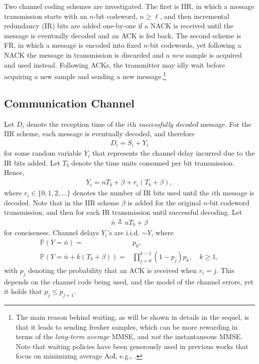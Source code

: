 \documentclass[12pt,journal,onecolumn]{IEEEtran}
\begin{document}
Two channel coding schemes are investigated. The first is IIR, in which a message transmission starts with an $n$-bit codeword, $n\geq\ell$, and then incremental redundancy (IR) bits are added one-by-one if a NACK is received until the message is eventually decoded and an ACK is fed back. The second scheme is FR, in which a message is encoded into fixed $n$-bit codewords, yet following a NACK the message in transmission is discarded and a {\it new} sample is acquired and used instead. Following ACKs, the transmitter may idly wait before acquiring a new sample and sending a new message.\footnote{The main reason behind waiting, as will be shown in details in the sequel, is that it leads to sending fresher samples, which can be more rewarding in terms of the {\it long-term average} MMSE, and {\it not} the instantaneous MMSE. Note that waiting policies have been generously used in previous works that focus on minimizing average AoI, e.g., \cite{yates_age_eh, sun-age-mdp, arafa-age-online-finite}.}


\subsection{Communication Channel}

Let $D_i$ denote the reception time of the $i$th {\it successfully decoded} message. For the IIR scheme, each message is eventually decoded, and therefore
\begin{align}
D_i=S_i+Y_i
\end{align}
for some random variable $Y_i$ that represents the channel delay incurred due to the IR bits added. Let $T_b$ denote the time units consumed per bit transmission. Hence,
\begin{align}
Y_i=nT_b+\beta+r_i(T_b+\beta),
\end{align}
where $r_i\in\{0,1,2,\dots\}$ denotes the number of IR bits used until the $i$th message is decoded. Note that in the IIR scheme $\beta$ is added for the original $n$-bit codeword transmission, and then for each IR transmission until successful decoding. Let 
\begin{align}
\bar{n}\triangleq nT_b+\beta
\end{align}
for conciseness. Channel delays $Y_i$'s are i.i.d. $\sim Y$, where
\begin{align}
\mathbb{P}\left(Y=\bar{n}\right)=&p_0, \label{eq_Y_dist_1} \\
\mathbb{P}\left(Y=\bar{n}+k(T_b+\beta)\right)=&\prod_{j=0}^{k-1}(1-p_j)p_k,\quad k\geq1, \label{eq_Y_dist_2}
\end{align}
with $p_j$ denoting the probability that an ACK is received when $r_i=j$. This depends on the channel code being used, and the model of the channel errors, yet it holds that $p_j\leq p_{j+1}$.
\end{document}
